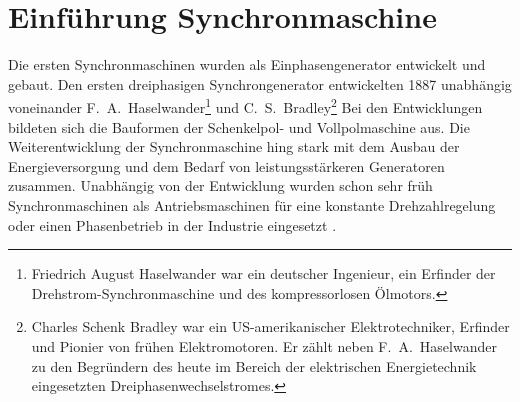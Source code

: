 



\section{Einführung Synchronmaschine}\label{sec:synchron}

Die ersten Synchronmaschinen wurden als Einphasengenerator entwickelt und gebaut. Den ersten dreiphasigen Synchrongenerator entwickelten 1887 unabhängig voneinander F.~A.~Haselwander\footnote{Friedrich August Haselwander war ein deutscher Ingenieur, ein Erfinder der Drehstrom-Synchronmaschine und des kompressorlosen Ölmotors.} und C.~S.~Bradley\footnote{Charles Schenk Bradley war ein US-amerikanischer Elektrotechniker, Erfinder und Pionier von frühen Elektromotoren. Er zählt neben F.~A.~Haselwander zu den Begründern des heute im Bereich der elektrischen Energietechnik eingesetzten Dreiphasenwechselstromes.} Bei den Entwicklungen bildeten sich die Bauformen der Schenkelpol- und Vollpolmaschine aus. Die Weiterentwicklung der Synchronmaschine hing stark mit dem Ausbau der Energieversorgung und dem Bedarf von leistungsstärkeren Generatoren zusammen. Unabhängig von der Entwicklung wurden schon sehr früh Synchronmaschinen als Antriebsmaschinen für eine konstante Drehzahlregelung oder einen Phasenbetrieb in der Industrie eingesetzt \autocites[S.~287]{fischer2009}[S.~485f.]{mullerI2005}.

